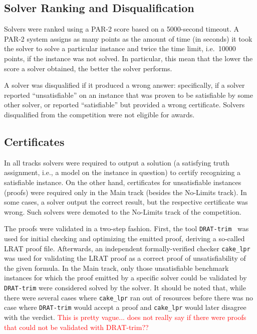 \documentclass{elsarticle}
\begin{document}
\subsection{Solver Ranking and Disqualification}

Solvers were ranked using a PAR-2 score based on a \num{5000}-second timeout.
A PAR-2 system assigns as many points as the amount of time (in seconds) it took the solver
to solve a particular instance and twice the time limit, i.e.~\num{10000} points,
if the instance was not solved. In particular, this mean that the lower the score a solver
obtained, the better the solver performs.

A  solver was disqualified if it produced a wrong answer:
specifically, if a solver reported ``unsatisfiable'' on an instance that 
was proven to be satisfiable by some other solver, or reported ``satisfiable'' 
but provided a wrong certificate. Solvers disqualified from the competition were
not eligible for awards.

\subsection{Certificates}

\label{sec:certif}

In all tracks solvers were required to output a solution (a satisfying truth assignment, i.e., a model on the instance in question)
 to certify recognizing a satisfiable instance.
On the other hand, 
certificates for unsatisfiable instances (proofs) were required only 
in the Main track (besides the No-Limits track).
In some cases, a solver output the correct result, but the respective certificate was wrong. 
Such solvers were demoted to the No-Limits track of the competition. 

The proofs were validated in a two-step fashion. First, the tool {\tt DRAT-trim}~\cite{DRATtrim}
was used for initial checking and optimizing the emitted proof, deriving a so-called LRAT proof file.
Afterwards, an independent formally-verified checker {\tt cake\_lpr} \cite{cakeLprGithub}
was used for validating the LRAT proof as a correct proof of unsatisfiability of the given formula.
In the Main track, only those unsatisfiable benchmark instances for which the proof emitted by a specific solver
could be validated by {\tt DRAT-trim} were considered solved by the  solver.
It should be noted that, while there were several cases where {\tt cake\_lpr} ran out of resources before 
there was no case where {\tt DRAT-trim} would accept
a proof and {\tt cake\_lpr} would later disagree with the verdict.
\textcolor{red}{This is pretty vague... does not really say if there were proofs that could not be validated with DRAT-trim??}
\end{document}
